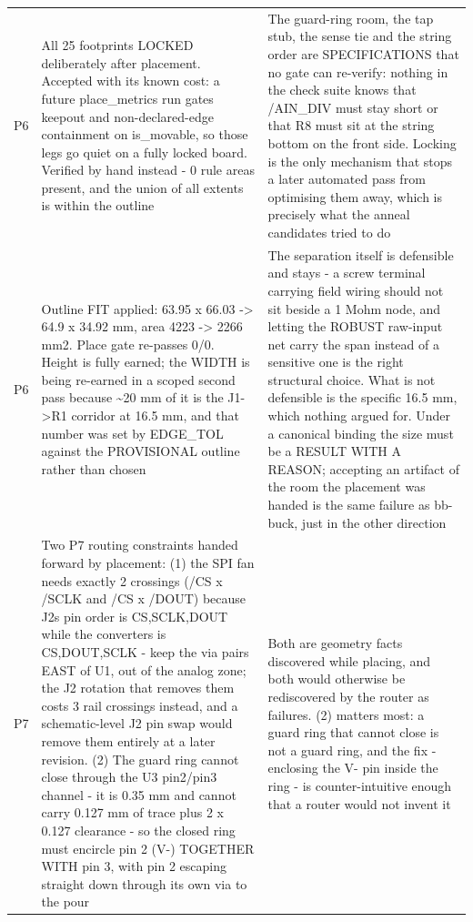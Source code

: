 \documentclass[11pt,a4paper]{article}
\begin{document}
{\begin{longtable}{lp{5.2cm}p{7.2cm}}
P6 & All 25 footprints LOCKED deliberately after placement. Accepted with its known cost: a future place\_metrics run gates keepout and non-declared-edge containment on is\_movable, so those legs go quiet on a fully locked board. Verified by hand instead - 0 rule areas present, and the union of all extents is within the outline & The guard-ring room, the tap stub, the sense tie and the string order are SPECIFICATIONS that no gate can re-verify: nothing in the check suite knows that /AIN\_DIV must stay short or that R8 must sit at the string bottom on the front side. Locking is the only mechanism that stops a later automated pass from optimising them away, which is precisely what the anneal candidates tried to do \\
P6 & Outline FIT applied: 63.95 x 66.03 -\textgreater{} 64.9 x 34.92 mm, area 4223 -\textgreater{} 2266 mm2. Place gate re-passes 0/0. Height is fully earned; the WIDTH is being re-earned in a scoped second pass because \textasciitilde{}20 mm of it is the J1-\textgreater{}R1 corridor at 16.5 mm, and that number was set by EDGE\_TOL against the PROVISIONAL outline rather than chosen & The separation itself is defensible and stays - a screw terminal carrying field wiring should not sit beside a 1 Mohm node, and letting the ROBUST raw-input net carry the span instead of a sensitive one is the right structural choice. What is not defensible is the specific 16.5 mm, which nothing argued for. Under a canonical binding the size must be a RESULT WITH A REASON; accepting an artifact of the room the placement was handed is the same failure as bb-buck, just in the other direction \\
P7 & Two P7 routing constraints handed forward by placement: (1) the SPI fan needs exactly 2 crossings (/CS x /SCLK and /CS x /DOUT) because J2s pin order is CS,SCLK,DOUT while the converters is CS,DOUT,SCLK - keep the via pairs EAST of U1, out of the analog zone; the J2 rotation that removes them costs 3 rail crossings instead, and a schematic-level J2 pin swap would remove them entirely at a later revision. (2) The guard ring cannot close through the U3 pin2/pin3 channel - it is 0.35 mm and cannot carry 0.127 mm of trace plus 2 x 0.127 clearance - so the closed ring must encircle pin 2 (V-) TOGETHER WITH pin 3, with pin 2 escaping straight down through its own via to the pour & Both are geometry facts discovered while placing, and both would otherwise be rediscovered by the router as failures. (2) matters most: a guard ring that cannot close is not a guard ring, and the fix - enclosing the V- pin inside the ring - is counter-intuitive enough that a router would not invent it \\

\end{longtable}}
\end{document}

